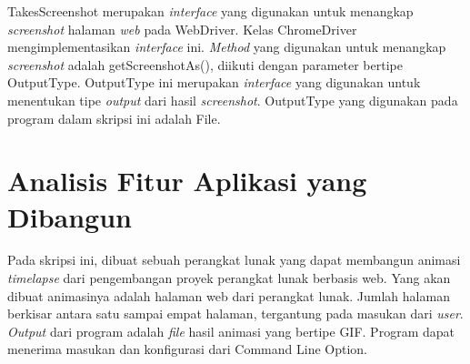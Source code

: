 TakesScreenshot merupakan \textit{interface} yang digunakan untuk menangkap \textit{screenshot} halaman \textit{web} pada WebDriver. Kelas ChromeDriver mengimplementasikan \textit{interface} ini. \textit{Method} yang digunakan untuk menangkap \textit{screenshot} adalah getScreenshotAs(), diikuti dengan parameter bertipe OutputType. OutputType ini merupakan \textit{interface} yang digunakan untuk menentukan tipe \textit{output} dari hasil \textit{screenshot}. OutputType yang digunakan pada program dalam skripsi ini adalah File.    



\section{Analisis Fitur Aplikasi yang Dibangun}
\label{sec:analisis_fitur_aplikasi}
Pada skripsi ini, dibuat sebuah perangkat lunak yang dapat membangun animasi \textit{timelapse}
dari pengembangan proyek perangkat lunak berbasis web. Yang akan dibuat animasinya adalah
halaman web dari perangkat lunak. Jumlah halaman berkisar antara satu sampai empat halaman, tergantung pada masukan dari \textit{user}. \textit{Output} dari program adalah \textit{file} hasil animasi yang bertipe GIF. Program dapat menerima masukan dan konfigurasi dari Command Line Option. 

